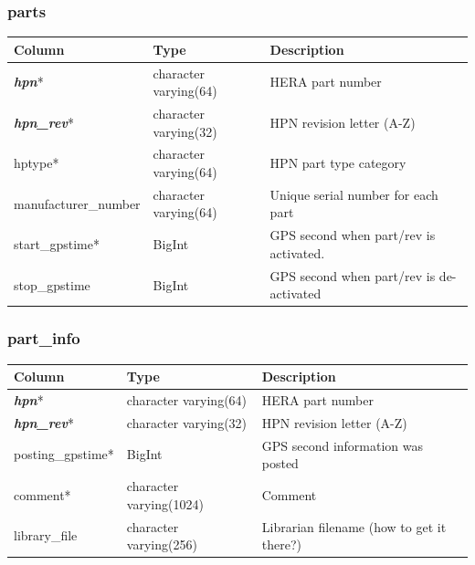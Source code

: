 \documentclass{article}
\begin{document}
{\subsubsection{parts}
\begin{center}
\begin{tabular}{| p{4cm} | p{2cm} | p{10cm} |}
\hline
{\bf Column} & {\bf Type} & {\bf Description} \\ \hline
{\bf \em hpn}* & character varying(64) & HERA part number \\ \hline
{\bf \em hpn\_rev}* & character varying(32) & HPN revision letter (A-Z) \\ \hline
hptype*  &  character varying(64) & HPN part type category \\ \hline
manufacturer\_number & character varying(64) & Unique serial number for each part \\ \hline
start\_gpstime* & BigInt & GPS second when part/rev is activated. \\ \hline
stop\_gpstime & BigInt & GPS second when part/rev is de-activated \\ \hline
\end{tabular}
\end{center}

\subsubsection{part\_info}
\begin{center}
\begin{tabular}{| p{4cm} | p{2cm} | p{10cm} |}
\hline
{\bf Column} & {\bf Type} & {\bf Description} \\ \hline
{\bf \em hpn}* & character varying(64) & HERA part number \\ \hline
{\bf \em hpn\_rev}* & character varying(32) & HPN revision letter (A-Z) \\ \hline
posting\_gpstime* & BigInt & GPS second information was posted \\ \hline
comment* &  character varying(1024) & Comment \\ \hline
library\_file & character varying(256) &  Librarian filename (how to get it there?) \\ \hline
\end{tabular}
\end{center}

}
\end{document}
